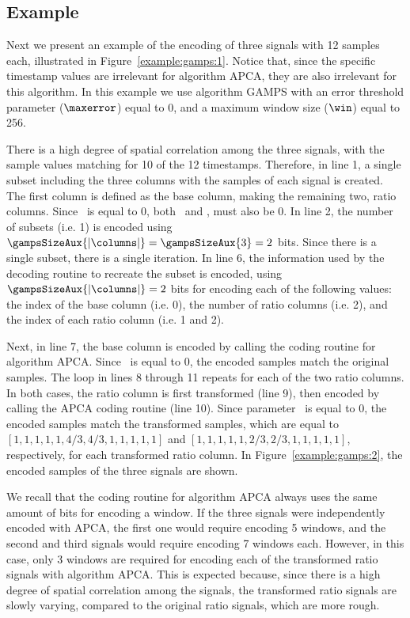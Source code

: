 \clearpage


\subsection{Example}
\label{algo:gamps:example}


Next we present an example of the encoding of three signals with 12 samples each, illustrated in Figure~\ref{example:gamps:1}. Notice that, since the specific timestamp values are irrelevant for algorithm APCA, they are also irrelevant for this algorithm. In this example we use algorithm GAMPS with an error threshold parameter ($\maxerror$) equal to 0, and a maximum window size ($\win$) equal to 256.




There is a high degree of spatial correlation among the three signals, with the sample values matching for 10 of the 12 timestamps. Therefore, in line 1, a single subset including the three columns with the samples of each signal is created. The first column is defined as the base column, making the remaining two, ratio columns. Since \maxerror\ is equal to 0, both \epsilonB\ and \epsilonR, must also be 0. In line 2, the number of subsets (i.e. 1) is encoded using $\gampsSizeAux{|\columns|}=\gampsSizeAux{3}=2$ bits. Since there is a single subset, there is a single iteration. In line 6, the information used by the decoding routine to recreate the subset is encoded, using $\gampsSizeAux{|\columns|}=2$ bits for encoding each of the following values: the index of the base column (i.e. 0), the number of ratio columns (i.e. 2), and the index of each ratio column (i.e. 1 and 2). 


Next, in line 7, the base column is encoded by calling the coding routine for algorithm APCA. Since \epsilonB\ is equal to 0, the encoded samples match the original samples. The loop in lines 8 through 11 repeats for each of the two ratio columns. In both cases, the ratio column is first transformed (line 9), then encoded by calling the APCA coding routine (line 10). Since parameter \epsilonR\ is equal to 0, the encoded samples match the transformed samples, which are equal to $[1, 1, 1, 1, 1, 4/3, 4/3, 1, 1, 1, 1, 1]$ and $[1, 1, 1, 1, 1, 2/3, 2/3, 1, 1, 1, 1, 1]$, respectively, for each transformed ratio column. In Figure~\ref{example:gamps:2}, the encoded samples of the three signals are shown. 


We recall that the coding routine for algorithm APCA always uses the same amount of bits for encoding a window. If the three signals were independently encoded with APCA, the first one would require encoding 5 windows, and the second and third signals would require encoding 7 windows each. However, in this case, only 3 windows are required for encoding each of the transformed ratio signals with algorithm APCA. This is expected because, since there is a high degree of spatial correlation among the signals, the transformed ratio signals are slowly varying, compared to the original ratio signals, which are more rough.


